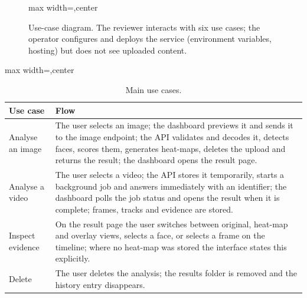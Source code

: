 \begin{figure}[ht]
\centering
\begin{adjustbox}{max width=\linewidth,center}
\end{adjustbox}
\caption[Use-case diagram. The reviewer interacts with six use cases; the operator configures and]{Use-case diagram. The reviewer interacts with six use cases; the operator configures and deploys the service (environment
variables, hosting) but does not see uploaded content.}
\label{fig:usecase}
\end{figure}

\begin{table}[ht]
\centering
\caption{Main use cases.}
\label{tab:usecases}
\small
\begin{adjustbox}{max width=\linewidth,center}
\begin{tabular}{|p{2.6cm}|p{9.3cm}|}
\hline
\textbf{Use case} & \textbf{Flow} \\ \hline
Analyse an image & The user selects an image; the dashboard previews it and sends it to the image endpoint; the API validates and decodes it, detects faces, scores them, generates heat-maps, deletes the upload and returns the result; the dashboard opens the result page. \\ \hline
Analyse a video & The user selects a video; the API stores it temporarily, starts a background job and answers immediately with an identifier; the dashboard polls the job status and opens the result when it is complete; frames, tracks and evidence are stored. \\ \hline
Inspect evidence & On the result page the user switches between original, heat-map and overlay views, selects a face, or selects a frame on the timeline; where no heat-map was stored the interface states this explicitly. \\ \hline
Delete & The user deletes the analysis; the results folder is removed and the history entry disappears. \\ \hline
\end{tabular}
\end{adjustbox}
\end{table}

